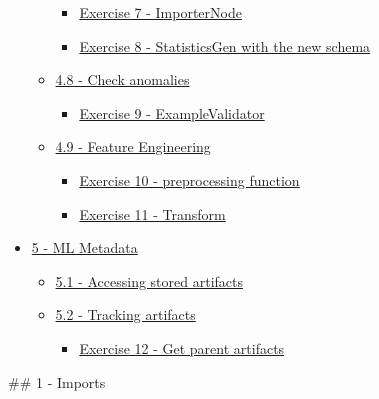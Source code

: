 \documentclass[11pt]{article}
\providecommand{\tightlist}{%
      \setlength{\itemsep}{0pt}\setlength{\parskip}{0pt}}
\begin{document}
\begin{itemize}
\begin{itemize}
    \begin{itemize}
    \tightlist
    \item
      \hyperref[ex-7]{Exercise 7 - ImporterNode}
    \item
      \hyperref[ex-8]{Exercise 8 - StatisticsGen with the new schema}
    \end{itemize}
  \item
    \hyperref[4-8]{4.8 - Check anomalies}

    \begin{itemize}
    \tightlist
    \item
      \hyperref[ex-9]{Exercise 9 - ExampleValidator}
    \end{itemize}
  \item
    \hyperref[4-9]{4.9 - Feature Engineering}

    \begin{itemize}
    \tightlist
    \item
      \hyperref[ex-10]{Exercise 10 - preprocessing function}
    \item
      \hyperref[ex-11]{Exercise 11 - Transform}
    \end{itemize}
  \end{itemize}
\item
  \hyperref[5]{5 - ML Metadata}

  \begin{itemize}
  \tightlist
  \item
    \hyperref[5-1]{5.1 - Accessing stored artifacts}
  \item
    \hyperref[5-2]{5.2 - Tracking artifacts}

    \begin{itemize}
    \tightlist
    \item
      \hyperref[ex-12]{Exercise 12 - Get parent artifacts}
    \end{itemize}
  \end{itemize}
\end{itemize}

    \#\# 1 - Imports
\end{document}
